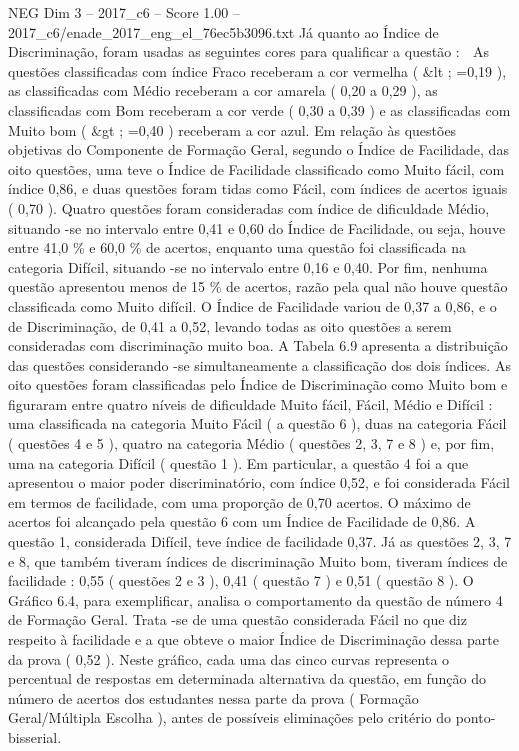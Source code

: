 \begin{textsample}{NEG Dim 3 – 2017\_c6 – Score 1.00 – 2017\_c6/enade\_2017\_eng\_el\_76ec5b3096.txt}
Já quanto ao Índice de Discriminação, foram usadas as seguintes cores para qualificar a questão :  As questões classificadas com índice Fraco receberam a cor vermelha ( \&lt ; =0,19 ), as classificadas com Médio receberam a cor amarela ( 0,20 a 0,29 ), as classificadas com Bom receberam a cor verde ( 0,30 a 0,39 ) e as classificadas com Muito bom ( \&gt ; =0,40 ) receberam a cor azul.
Em relação às questões objetivas do Componente de Formação Geral, segundo o Índice de Facilidade, das oito questões, uma teve o Índice de Facilidade classificado como Muito fácil, com índice 0,86, e duas questões foram tidas como Fácil, com índices de acertos iguais ( 0,70 ).
Quatro questões foram consideradas com índice de dificuldade Médio, situando -se no intervalo entre 0,41 e 0,60 do Índice de Facilidade, ou seja, houve entre 41,0 \% e 60,0 \% de acertos, enquanto uma questão foi classificada na categoria Difícil, situando -se no intervalo entre 0,16 e 0,40.
Por fim, nenhuma questão apresentou menos de 15 \% de acertos, razão pela qual não houve questão classificada como Muito difícil.
O Índice de Facilidade variou de 0,37 a 0,86, e o de Discriminação, de 0,41 a 0,52, levando todas as oito questões a serem consideradas com discriminação muito boa.
A Tabela 6.9 apresenta a distribuição das questões considerando -se simultaneamente a classificação dos dois índices.
As oito questões foram classificadas pelo Índice de Discriminação como Muito bom e figuraram entre quatro níveis de dificuldade Muito fácil, Fácil, Médio e Difícil : uma classificada na categoria Muito Fácil ( a questão 6 ), duas na categoria Fácil ( questões 4 e 5 ), quatro na categoria Médio ( questões 2, 3, 7 e 8 ) e, por fim, uma na categoria Difícil ( questão 1 ).
Em particular, a questão 4 foi a que apresentou o maior poder discriminatório, com índice 0,52, e foi considerada Fácil em termos de facilidade, com uma proporção de 0,70 acertos.
O máximo de acertos foi alcançado pela questão 6 com um Índice de Facilidade de 0,86.
A questão 1, considerada Difícil, teve índice de facilidade 0,37.
Já as questões 2, 3, 7 e 8, que também tiveram índices de discriminação Muito bom, tiveram índices de facilidade : 0,55 ( questões 2 e 3 ), 0,41 ( questão 7 ) e 0,51 ( questão 8 ).
O Gráfico 6.4, para exemplificar, analisa o comportamento da questão de número 4 de Formação Geral.
Trata -se de uma questão considerada Fácil no que diz respeito à facilidade e a que obteve o maior Índice de Discriminação dessa parte da prova ( 0,52 ).
Neste gráfico, cada uma das cinco curvas representa o percentual de respostas em determinada alternativa da questão, em função do número de acertos dos estudantes nessa parte da prova ( Formação Geral/Múltipla Escolha ), antes de possíveis eliminações pelo critério do ponto-bisserial.

\end{textsample}
